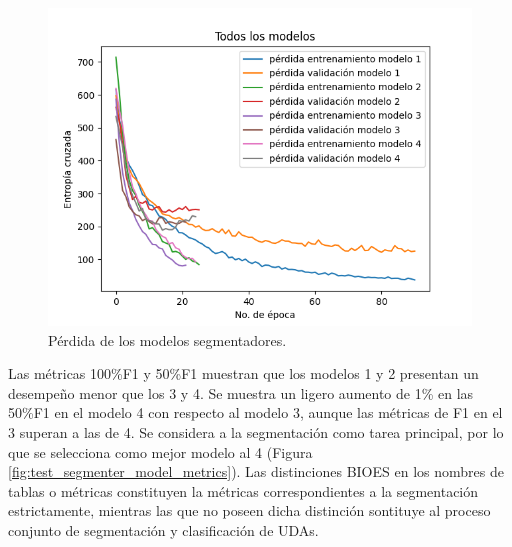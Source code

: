 \begin{figure}[h!]
	\begin{center}
		\begin{center}
			\includegraphics[scale=.7]{Graphics/persuasive_essays_all_linked_crf_loss.png}
        \end{center}
	    \caption{Pérdida de los modelos segmentadores.}\label{fig:segmenter_model_loss}
	\end{center}
\end{figure}

Las métricas 100\%F1 y 50\%F1 muestran que los modelos 1 y 2 presentan un desempeño menor que los 3 y 4. 
Se muestra un ligero aumento de 1\% en las 50\%F1 en el modelo 4 con respecto 
al modelo 3, aunque las métricas de F1 en el 3 superan a las de 4. Se considera a la 
segmentación como tarea principal, por lo que se selecciona como mejor modelo al 4 (Figura \ref{fig:test_segmenter_model_metrics}).
Las distinciones BIOES en los nombres de tablas o métricas constituyen la métricas correspondientes 
a la segmentación estrictamente, mientras las que no poseen dicha distinción sontituye al proceso 
conjunto de segmentación y clasificación de UDAs. 


